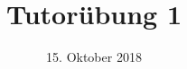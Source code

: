 %
% 
% 
%







\newcommand{\Datum}{\today}

\renewcommand{\PraesentationFusszeileZusatz}{| Tutorium Einführung in die Rechnerarchitektur WS 2018/2019}

\title{Tutorübung 1}
\author{\PersonVorname{} \PersonNachname}
\institute[]{\UniversitaetName \\ \FakultaetName}
\date[\Datum]{15. Oktober 2018}



\setlength{\baselineskip}{\PraesentationAbstandAbsatz}
\setlength{\parskip}{\baselineskip}

\PraesentationMasterStandard

\PraesentationTitelseite %

